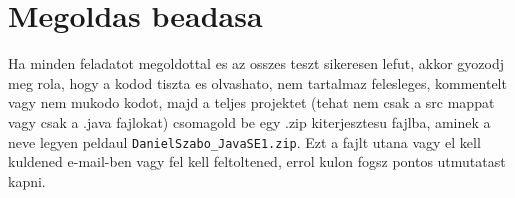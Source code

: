\documentclass{article}
\begin{document}
\section{Megoldas beadasa}
Ha minden feladatot megoldottal es az osszes teszt sikeresen lefut, akkor gyozodj meg rola, hogy a kodod tiszta es olvashato, nem tartalmaz felesleges, kommentelt vagy nem mukodo kodot, majd a teljes projektet (tehat nem csak a src mappat vagy csak a .java fajlokat) csomagold be egy .zip kiterjesztesu fajlba, aminek a neve legyen peldaul \lstinline{DanielSzabo_JavaSE1.zip}. Ezt a fajlt utana vagy el kell kuldened e-mail-ben vagy fel kell feltoltened, errol kulon fogsz pontos utmutatast kapni.
\end{document}
